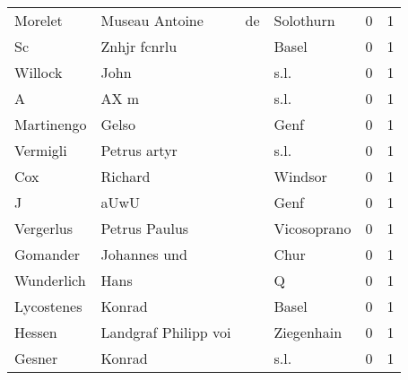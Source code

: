 \documentclass[10pt,a4paper,landscape]{article}
\begin{document}
\begin{longtable}{llllrr}
                  Morelet &                     Museau Antoine &          de &                                   Solothurn &          0 &         1 \\
                       Sc &                       Znhjr fcnrlu &             &                                       Basel &          0 &         1 \\
                  Willock &                               John &             &                                        s.l. &          0 &         1 \\
                        A &                               AX m &             &                                        s.l. &          0 &         1 \\
               Martinengo &                              Gelso &             &                                        Genf &          0 &         1 \\
                 Vermigli &                       Petrus artyr &             &                                        s.l. &          0 &         1 \\
                      Cox &                            Richard &             &                                     Windsor &          0 &         1 \\
                        J &                               aUwU &             &                                        Genf &          0 &         1 \\
                Vergerlus &                      Petrus Paulus &             &                                 Vicosoprano &          0 &         1 \\
                 Gomander &                       Johannes und &             &                                        Chur &          0 &         1 \\
               Wunderlich &                               Hans &             &                                           Q &          0 &         1 \\
               Lycostenes &                             Konrad &             &                                       Basel &          0 &         1 \\
                   Hessen &               Landgraf Philipp voi &             &                                  Ziegenhain &          0 &         1 \\
                   Gesner &                             Konrad &             &                                        s.l. &          0 &         1 \\

\end{longtable}
\end{document}
